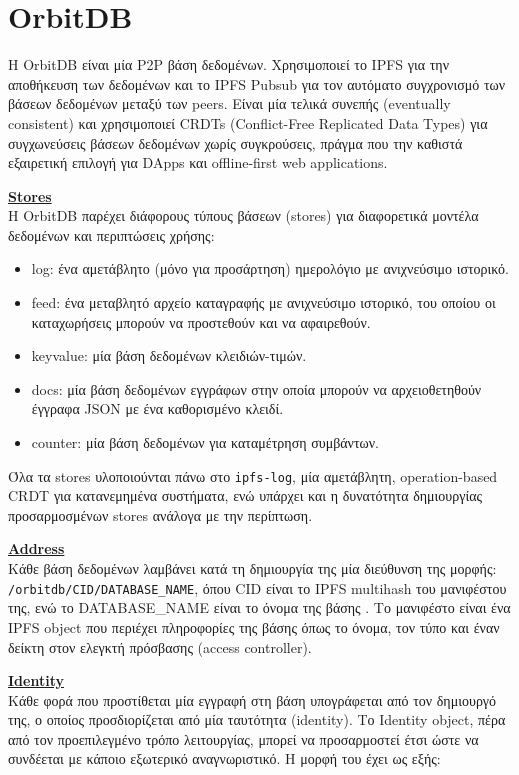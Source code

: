 \section{OrbitDB}

Η OrbitDB είναι μία P2P βάση δεδομένων. Χρησιμοποιεί το IPFS για την αποθήκευση των δεδομένων και το IPFS Pubsub για τον αυτόματο συγχρονισμό των βάσεων δεδομένων μεταξύ των peers. Είναι μία τελικά συνεπής (eventually consistent) και χρησιμοποιεί CRDTs (Conflict-Free Replicated Data Types) για συγχωνεύσεις βάσεων δεδομένων χωρίς συγκρούσεις, πράγμα που την καθιστά εξαιρετική επιλογή για DApps και offline-first web applications. %

\underline{\textbf{Stores}}\\
Η OrbitDB παρέχει διάφορους τύπους βάσεων (stores) για διαφορετικά μοντέλα δεδομένων και περιπτώσεις χρήσης:

\begin{itemize}
	\item log: ένα αμετάβλητο (μόνο για προσάρτηση) ημερολόγιο με ανιχνεύσιμο ιστορικό.
	\item feed: ένα μεταβλητό αρχείο καταγραφής με ανιχνεύσιμο ιστορικό, του οποίου οι καταχωρήσεις μπορούν να προστεθούν και να αφαιρεθούν.
	\item keyvalue: μία βάση δεδομένων κλειδιών-τιμών.
	\item docs: μία βάση δεδομένων εγγράφων στην οποία μπορούν να αρχειοθετηθούν έγγραφα JSON με ένα καθορισμένο κλειδί.
	\item counter: μία βάση δεδομένων για καταμέτρηση συμβάντων.
\end{itemize}

Όλα τα stores υλοποιούνται πάνω στο \texttt{ipfs-log}, μία αμετάβλητη, operation-based CRDT για κατανεμημένα συστήματα, ενώ υπάρχει και η δυνατότητα δημιουργίας προσαρμοσμένων stores ανάλογα με την περίπτωση.

\underline{\textbf{Address}}\\
Κάθε βάση δεδομένων λαμβάνει κατά τη δημιουργία της μία διεύθυνση της μορφής: \texttt{/orbitdb/CID/DATABASE\_NAME}, όπου CID είναι το IPFS multihash του μανιφέστου της, ενώ το DATABASE\_NAME είναι το όνομα της βάσης %
. Το μανιφέστο είναι ένα IPFS object που περιέχει πληροφορίες της βάσης όπως το όνομα, τον τύπο και έναν δείκτη στον ελεγκτή πρόσβασης (access controller).

\underline{\textbf{Identity}}\\
Κάθε φορά που προστίθεται μία εγγραφή στη βάση υπογράφεται από τον δημιουργό της, ο οποίος προσδιορίζεται από μία ταυτότητα (identity). Το Identity object, πέρα από τον προεπιλεγμένο τρόπο λειτουργίας, μπορεί να προσαρμοστεί έτσι ώστε να συνδέεται με κάποιο εξωτερικό αναγνωριστικό. %
Η μορφή του έχει ως εξής:

